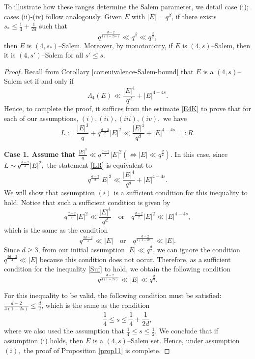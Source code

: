 \documentclass[11pt]{article}
\begin{document}
To illustrate how these ranges determine the Salem parameter, we detail case (i); cases (ii)-(iv) follow analogously. Given $E$ with $|E|=q^\beta$, if there exists $s_\ast \le \frac{1}{4}+\frac{1}{2d}$ such that
\[
q^{\frac{d-2}{4(1-2s_\ast)}} \ll q^\beta \ll q^{\frac{d}{2}},
\]
then $E$ is $(4,s_\ast)$--Salem. Moreover, by monotonicity, if $E$ is $(4,s)$--Salem, then it is
$(4,s')$--Salem for all $s'\le s$. 

\begin{proof}  Recall from Corollary \ref{cor:euivalence-Salem-bound} that  $E$ is a $(4, s)$--Salem set  if and only if
\[ \Lambda_4(E) \ll \frac{|E|^4}{q^d}+ |E|^{4-4s} .\]  
Hence, to complete the proof,   it suffices from the estimate \eqref{E4K} to prove that  for  each of our assumptions, $(i), (ii), (iii), (iv),$ we have
\begin{equation} \label{LR} L:=  \frac{|E|^3}{q} + q^{\frac{d-2}{2}}|E|^2 \ll  \frac{|E|^4}{q^d}+ |E|^{4-4s}=: R. \end{equation}

\medskip
\noindent
\textbf{Case 1. Assume that $\frac{|E|^3}{q} \ll q^{\frac{d-2}{2}}|E|^2 (\iff |E| \ll q^{\frac{d}{2}})$}.
In this case,  since $L\sim q^{\frac{d-2}{2}}|E|^2, $ the statement \eqref{LR}  is equivalent to
\begin{equation}\label{Suf} q^{\frac{d-2}{2}}|E|^2  \ll  \frac{|E|^4}{q^d}+ |E|^{4-4s}.\end{equation}
We will show that  assumption $(i)$ is a sufficient condition for this inequality to hold.
Notice that such a sufficient condition is given by 
\[ q^{\frac{d-2}{2}}|E|^2 \ll \frac{|E|^4}{q^d}  \quad \mbox{or} \quad  q^{\frac{d-2}{2}}|E|^2 \ll  |E|^{4-4s},\]
which is  the same as the condition
$$  q^{\frac{3d-2}{4}} \ll |E|  \quad \mbox{or}\quad q^{\frac{d-2}{4(1-2s)} }\ll |E|.$$
Since $d\ge 3$, from our initial assumption $|E|\ll q^{\frac{d}{2}}$, we can ignore the condition $q^{\frac{3d-2}{4}} \ll |E|$ because this condition does not occur.  Therefore, as a sufficient condition for the inequality \eqref{Suf} to hold, we obtain the following condition
\[q^{\frac{d-2}{4(1-2s)} }\ll |E| \ll q^{\frac{d}{2}}.\]

For this inequality to be valid, the following condition must be satisfied: 
$\frac{d-2}{4(1-2s)} \le \frac{d}{2}$, which is the same as the condition $$\frac{1}{4} \leq s \le \frac{1}{4}+\frac{1}{2d},$$
where we also used the assumption that  $\frac{1}{4}\leq s \leq \frac{1}{2}.$
We conclude that  if assumption (i) holds, then  $E$ is a $(4,s)$--Salem set.  Hence, under assumption $(i),$ the proof of Proposition \ref{prop11} is complete.


\end{proof}
\end{document}
